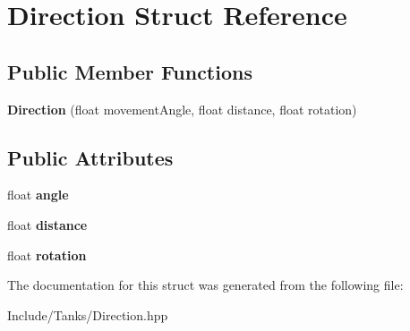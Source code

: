 \hypertarget{struct_direction}{}\section{Direction Struct Reference}
\label{struct_direction}
\subsection*{Public Member Functions}
\begin{DoxyCompactItemize}
\item 
\hypertarget{struct_direction_a4b7fbea88026265cf268369987ec4bb7}{}{\bfseries Direction} (float movement\+Angle, float distance, float rotation)\label{struct_direction_a4b7fbea88026265cf268369987ec4bb7}

\end{DoxyCompactItemize}
\subsection*{Public Attributes}
\begin{DoxyCompactItemize}
\item 
\hypertarget{struct_direction_a8eaabd2d06c6274e92866814cfb6a2ea}{}float {\bfseries angle}\label{struct_direction_a8eaabd2d06c6274e92866814cfb6a2ea}

\item 
\hypertarget{struct_direction_a6cf81244bffe43d4b4d1bc8a3f63772a}{}float {\bfseries distance}\label{struct_direction_a6cf81244bffe43d4b4d1bc8a3f63772a}

\item 
\hypertarget{struct_direction_adc976fea5f08991089819266d9acbca5}{}float {\bfseries rotation}\label{struct_direction_adc976fea5f08991089819266d9acbca5}

\end{DoxyCompactItemize}


The documentation for this struct was generated from the following file\+:\begin{DoxyCompactItemize}
\item 
Include/\+Tanks/Direction.\+hpp\end{DoxyCompactItemize}

